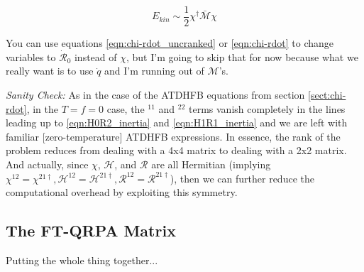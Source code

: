 \begin{equation}
E_{kin} \sim \frac{1}{2}\chi^\dagger\mathcal{\bar{M}}\chi
\end{equation}

You can use equations \ref{eqn:chi-rdot_uncranked} or \ref{eqn:chi-rdot} to change variables to $\mathcal{\dot{R}}_0$ instead of $\chi$, but I'm going to skip that for now because what we really want is to use $\dot{q}$ and I'm running out of $\mathcal{M}$'s.

\noindent\textit{Sanity Check:} As in the case of the ATDHFB equations from section \ref{sect:chi-rdot}, in the $T=f=0$ case, the $^{11}$ and $^{22}$ terms vanish completely in the lines leading up to \ref{eqn:H0R2_inertia} and \ref{eqn:H1R1_inertia} and we are left with familiar [zero-temperature] ATDHFB expressions. In essence, the rank of the problem reduces from dealing with a 4x4 matrix to dealing with a 2x2 matrix. And actually, since $\chi$, $\mathcal{H}$, and $\mathcal{R}$ are all Hermitian (implying $\chi^{12}=\chi^{21\dagger}, \mathcal{H}^{12}=\mathcal{H}^{21\dagger}, \mathcal{R}^{12}=\mathcal{R}^{21\dagger}$), then we can further reduce the computational overhead by exploiting this symmetry.

\subsection{The FT-QRPA Matrix}

Putting the whole thing together...

